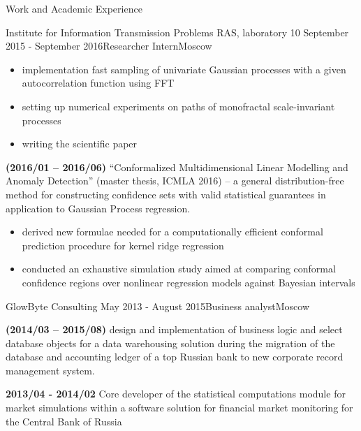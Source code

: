 \documentclass{resume} %
\begin{document}
\begin{rSection}{Work and Academic Experience}
\begin{rSubsection}{
        Institute for Information Transmission Problems RAS, laboratory 10
    }{September 2015 - September 2016}{Researcher Intern}{Moscow}
\begin{itemize}
        \item implementation fast sampling of univariate Gaussian processes with a given autocorrelation function using FFT

        \item setting up numerical experiments on paths of monofractal scale-invariant processes

        \item writing the scientific paper
    \end{itemize}

    \item \textbf{(2016/01 -- 2016/06)}
    ``Conformalized Multidimensional Linear Modelling and Anomaly Detection'' (master thesis, ICMLA 2016) -- a general distribution-free method for constructing confidence sets with valid statistical guarantees in application to Gaussian Process regression.
    \begin{itemize}
        \item derived new formulae needed for a computationally efficient conformal prediction procedure for kernel ridge regression

        \item conducted an exhaustive simulation study aimed at comparing conformal confidence regions over nonlinear regression models against Bayesian intervals

    \end{itemize}
\end{rSubsection}

\begin{rSubsection}{
        GlowByte Consulting
    }{May 2013 - August 2015}{Business analyst}{Moscow}
    \item \textbf{(2014/03 -- 2015/08)}
    design and implementation of business logic and select database objects for a data warehousing solution during the migration of the database and accounting ledger of a top Russian bank to new corporate record management system.

    \item \textbf{2013/04 - 2014/02}
    Core developer of the statistical computations module for market simulations within a software solution for financial market monitoring for the Central Bank of Russia
\end{rSubsection}


\end{rSection}
\end{document}
